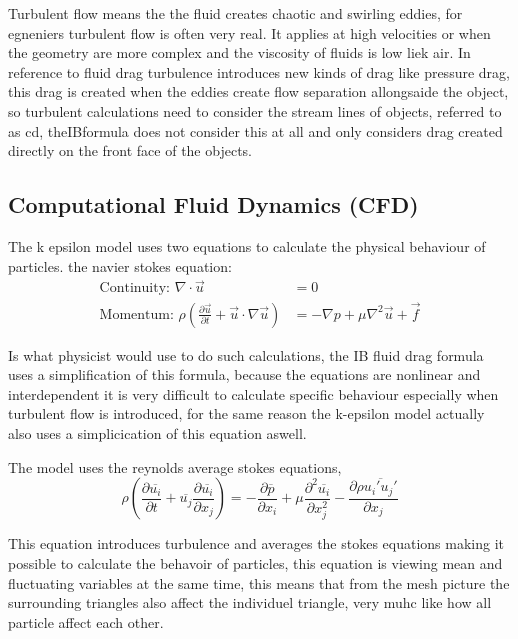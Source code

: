 \documentclass[12pt,a4paper]{article}
\begin{document}
Turbulent flow means the the fluid creates chaotic and swirling eddies, for egneniers turbulent flow is often very real. It applies at high velocities or when the geometry are more complex and the viscosity of fluids is low liek air. In reference to fluid drag turbulence introduces new kinds of drag like pressure drag, this drag is created when the eddies create flow separation allongsaide the object, so turbulent calculations need to consider the stream lines of objects, referred to as cd, theIBformula does not consider this at all and only considers drag created directly on the front face of the objects. 

\subsection{Computational Fluid Dynamics (CFD)}

The k epsilon model uses two equations to calculate the physical behaviour of particles.
the navier stokes equation: 
\begin{align}
\text{Continuity: } \nabla \cdot \vec{u} &= 0\\
\text{Momentum: } \rho\left(\frac{\partial \vec{u}}{\partial t} + \vec{u} \cdot \nabla \vec{u}\right) &= -\nabla p + \mu \nabla^2 \vec{u} + \vec{f}
\end{align}

Is what physicist would use to do such calculations, the IB fluid drag formula uses a simplification of this formula, because the equations are nonlinear and interdependent it is very difficult to calculate specific behaviour especially when turbulent flow is introduced, for the same reason the k-epsilon model actually also uses a simplicication of this equation aswell.

The model uses the reynolds average stokes equations,
\begin{equation}
\rho\left(\frac{\partial \overline{u_i}}{\partial t} + \overline{u_j}\frac{\partial \overline{u_i}}{\partial x_j}\right) = -\frac{\partial \overline{p}}{\partial x_i} + \mu\frac{\partial^2 \overline{u_i}}{\partial x_j^2} - \frac{\partial \rho\overline{u_i' u_j'}}{\partial x_j}
\end{equation}

This equation introduces turbulence and averages the stokes equations making it possible to calculate the behavoir of particles,  this equation is viewing mean and fluctuating variables at the same time, this means that from the mesh picture the surrounding triangles also affect the individuel triangle, very muhc like how all particle affect each other.
\end{document}
